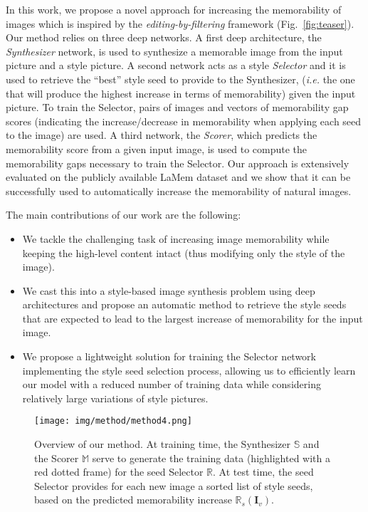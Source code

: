 \documentclass{sig-alternate-05-2015}
\begin{document}
In this work, we propose a novel approach for increasing the memorability of images which is inspired by the \textit{editing-by-filtering} framework (Fig.~\ref{fig:teaser}). Our method relies on three deep networks. A first deep architecture, the \textit{Synthesizer} network, is used to synthesize a memorable image from the input picture and a style picture. A second network acts as a style \textit{Selector} and it is used to retrieve the ``best'' style seed to provide to the Synthesizer, (\textit{i.e.} the one that will produce the highest increase in terms of memorability) given the input picture. %
To train the Selector, pairs of images and vectors of memorability gap scores (indicating the increase/decrease in memorability when applying each seed to the image) are used. A third network, the \textit{Scorer}, which predicts the memorability score from a given input image, is used to compute the memorability gaps necessary to train the Selector.
Our approach is extensively evaluated on the publicly available LaMem dataset \cite{khosla2015understanding} and we show that it can be successfully used to automatically increase the memorability of natural images.


The main contributions of our work are the following:
\vspace{-0.1cm}
\begin{itemize}
\setlength\itemsep{0.0cm}
    \item We tackle the challenging task of increasing image memorability while keeping the high-level content intact (thus modifying only the style of the image).%
    \item We cast this into a style-based image synthesis problem using deep architectures 
    and propose an automatic method to retrieve the style seeds that are expected to lead to the largest increase of memorability for the input image.
    \item We propose a lightweight solution for training the Selector network implementing the style seed selection process, allowing us to efficiently learn our model with a reduced number of training data while considering  relatively large variations of style pictures.
\end{itemize}





\begin{figure*}[t]
\texttt{[image: img/method/method4.png]}
\vspace{-0.6cm}
\caption{Overview of our method. At training time, the Synthesizer $\mathbb{S}$ and the Scorer $\mathbb{M}$ serve to generate the training data (highlighted with a red dotted frame) for the seed Selector $\mathbb{R}$. 
At test time, the seed Selector provides for each new image a sorted list of style seeds, based on the predicted memorability increase $\mathbb{R}_{s}(\mathbf{I}_v)$.  }
\label{fig:method}
\vspace{-0.3cm}
\end{figure*}
\end{document}
